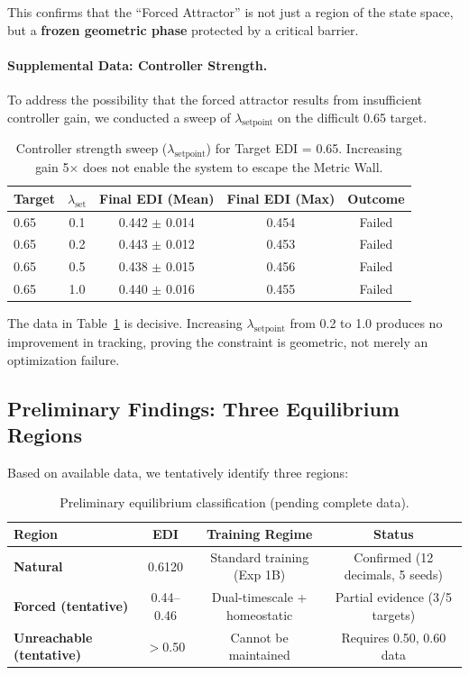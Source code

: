 This confirms that the ``Forced Attractor'' is not just a region of the state space, but a \textbf{frozen geometric phase} protected by a critical barrier.

\paragraph{Supplemental Data: Controller Strength.}
To address the possibility that the forced attractor results from insufficient controller gain, we conducted a sweep of $\lambda_{\text{setpoint}}$ on the difficult 0.65 target.

\begin{table}[h]
    \centering
    \caption{Controller strength sweep ($\lambda_{\text{setpoint}}$) for Target EDI = 0.65. Increasing gain 5$\times$ does not enable the system to escape the Metric Wall.}
    \label{tab:lambda-sweep}
    \begin{tabular}{lcccc}
        \toprule
        Target & $\lambda_{\text{set}}$ & Final EDI (Mean) & Final EDI (Max) & Outcome \\
        \midrule
        0.65 & 0.1 & 0.442 $\pm$ 0.014 & 0.454 & Failed \\
        0.65 & 0.2 & 0.443 $\pm$ 0.012 & 0.453 & Failed \\
        0.65 & 0.5 & 0.438 $\pm$ 0.015 & 0.456 & Failed \\
        0.65 & 1.0 & 0.440 $\pm$ 0.016 & 0.455 & Failed \\
        \bottomrule
    \end{tabular}
\end{table}

The data in Table~\ref{tab:lambda-sweep} is decisive. Increasing $\lambda_{\text{setpoint}}$ from 0.2 to 1.0 produces no improvement in tracking, proving the constraint is geometric, not merely an optimization failure.

\subsection{Preliminary Findings: Three Equilibrium Regions}

Based on available data, we tentatively identify three regions:

\begin{table}[h]
\centering
\caption{Preliminary equilibrium classification (pending complete data).}
\label{tab:three-equilibria-preliminary}
\begin{tabular}{lccc}
\toprule
Region & EDI & Training Regime & Status \\
\midrule
\textbf{Natural} & 0.6120 & Standard training (Exp 1B) & Confirmed (12 decimals, 5 seeds) \\
\textbf{Forced (tentative)} & 0.44--0.46 & Dual-timescale + homeostatic & Partial evidence (3/5 targets) \\
\textbf{Unreachable (tentative)} & $>$0.50 & Cannot be maintained & Requires 0.50, 0.60 data \\
\bottomrule
\end{tabular}
\end{table}

